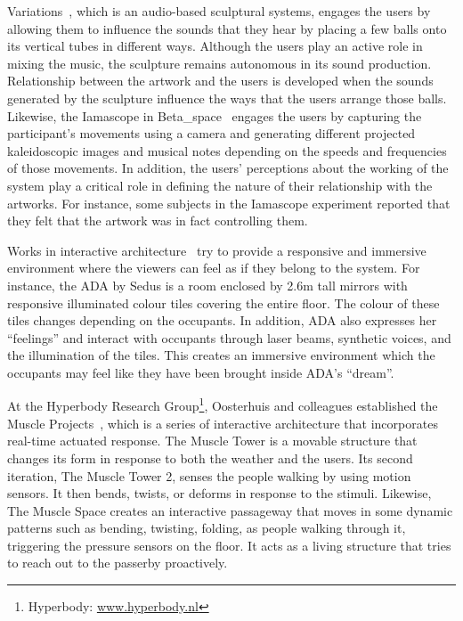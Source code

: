 Variations~\cite{Wands2005}, which is an audio-based sculptural systems, engages the users by allowing them to influence the sounds that they hear by placing a few balls onto its vertical tubes in different ways. Although the users play an active role in mixing the music, the sculpture remains autonomous in its sound production. Relationship between the artwork and the users is developed when the sounds generated by the sculpture influence the ways that the users arrange those balls. 
Likewise, the Iamascope in Beta\_space~\cite{Costello2005} engages the users by capturing the participant's movements using a camera and generating different projected kaleidoscopic images and musical notes depending on the speeds and frequencies of those movements. In addition, the users' perceptions about the working of the system play a critical role in defining the nature of their relationship with the artworks. For instance, some subjects in the Iamascope experiment reported that they felt that the artwork was in fact controlling them. 

Works in interactive architecture~\cite{Hangar.org}\cite{Fox2009} try to provide a responsive and immersive environment where the viewers can feel as if they belong to the system. For instance, the ADA by Sedus is a room enclosed by 2.6m tall mirrors with responsive illuminated colour tiles covering the entire floor. The colour of these tiles changes depending on the occupants. In addition, ADA also expresses her ``feelings'' and interact with occupants through laser beams, synthetic voices, and the illumination of the tiles. This creates an immersive environment which the occupants may feel like they have been brought inside ADA's ``dream''. 

At the Hyperbody Research Group\footnote{Hyperbody: \url{www.hyperbody.nl}}, Oosterhuis and colleagues established the Muscle Projects~\cite{Oosterhuis2008}, which is a series of interactive architecture that incorporates real-time actuated response. The Muscle Tower is a movable structure that changes its form in response to both the weather and the users. Its second iteration, The Muscle Tower 2, senses the people walking by using motion sensors. It then bends, twists, or deforms in response to the stimuli. Likewise, The Muscle Space creates an interactive passageway that moves in some dynamic patterns such as bending, twisting, folding, as people walking through it, triggering the pressure sensors on the floor. It acts as a living structure that tries to reach out to the passerby proactively.

